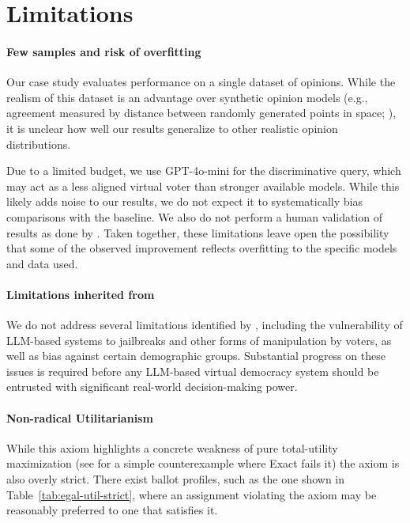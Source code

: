 \documentclass[11pt]{article}
\begin{document}

\section{Limitations}

\paragraph{Few samples and risk of overfitting}
Our case study evaluates performance on a single dataset of opinions. While the realism of this dataset is an advantage over synthetic opinion models (e.g., agreement measured by distance between randomly generated points in space; \citet{chandak-2023}), it is unclear how well our results generalize to other realistic opinion distributions.

Due to a limited budget, we use GPT-4o-mini for the discriminative query, which may act as a less aligned virtual voter than stronger available models. While this likely adds noise to our results, we do not expect it to systematically bias comparisons with the baseline. We also do not perform a human validation of results as done by \citet{fish-v2}. Taken together, these limitations leave open the possibility that some of the observed improvement reflects overfitting to the specific models and data used.

\paragraph{Limitations inherited from \citet{fish-v2}}
We do not address several limitations identified by \citet{fish-v2}, including the vulnerability of LLM-based systems to jailbreaks and other forms of manipulation by voters, as well as bias against certain demographic groups. Substantial progress on these issues is required before any LLM-based virtual democracy system should be entrusted with significant real-world decision-making power.

\paragraph{Non-radical Utilitarianism}
While this axiom highlights a concrete weakness of pure total-utility maximization (see  for a simple counterexample where Exact fails it) the axiom is also overly strict. There exist ballot profiles, such as the one shown in Table~\ref{tab:egal-util-strict}, where an assignment violating the axiom may be reasonably preferred to one that satisfies it.
\end{document}
